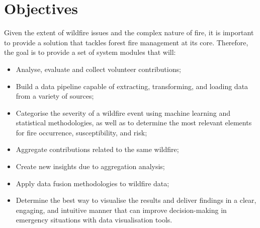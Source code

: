 \section{Objectives}
Given the extent of wildfire issues and the complex nature of fire, it is important to provide a solution that tackles forest fire management at its core. Therefore, the goal is to provide a set of system modules that will:
\begin{itemize}
    \item Analyse, evaluate and collect volunteer contributions;
    \item Build a data pipeline capable of extracting, transforming, and loading data from a variety of sources;
    \item Categorise the severity of a wildfire event using machine learning and statistical methodologies, as well as to determine the most relevant elements for fire occurrence, susceptibility, and risk;
    \item Aggregate contributions related to the same wildfire;
    \item Create new insights due to aggregation analysis;
    \item Apply data fusion methodologies to wildfire data;
    \item Determine the best way to visualise the results and deliver findings in a clear, engaging, and intuitive manner that can improve decision-making in emergency situations with data visualisation tools.
\end{itemize}


